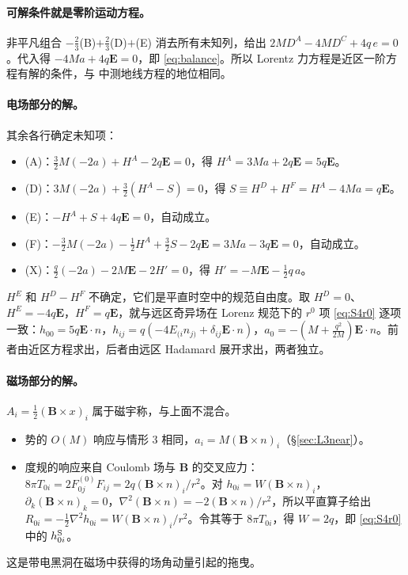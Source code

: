 \documentclass[11pt,a4paper]{ctexart}
\numberwithin{equation}{section}
\begin{document}
\paragraph{可解条件就是零阶运动方程。}非平凡组合 $-\tfrac23$(B)$+\tfrac23$(D)$+$(E) 消去所有未知列，给出 $2MD^A-4MD^C+4q\,e=0$。代入得 $-4Ma+4q\boldsymbol E=0$，即 \eqref{eq:balance}。所以 Lorentz 力方程是近区一阶方程有解的条件，与 \citet{GrallaWald2008} 中测地线方程的地位相同。

\paragraph{电场部分的解。}其余各行确定未知项：
\begin{itemize}
\item (A)：$\tfrac32M(-2a)+H^A-2q\boldsymbol E=0$，得 $H^A=3Ma+2q\boldsymbol E=5q\boldsymbol E$。
\item (D)：$3M(-2a)+\tfrac32(H^A-S)=0$，得 $S\equiv H^D+H^F=H^A-4Ma=q\boldsymbol E$。
\item (E)：$-H^A+S+4q\boldsymbol E=0$，自动成立。
\item (F)：$-\tfrac32M(-2a)-\tfrac12H^A+\tfrac32S-2q\boldsymbol E=3Ma-3q\boldsymbol E=0$，自动成立。
\item (X)：$\tfrac q2(-2a)-2M\boldsymbol E-2H'=0$，得 $H'=-M\boldsymbol E-\tfrac12q\,a$。
\end{itemize}
$H^E$ 和 $H^D-H^F$ 不确定，它们是平直时空中的规范自由度。取 $H^D=0$、$H^E=-4q\boldsymbol E$，$H^F=q\boldsymbol E$，就与远区奇异场在 Lorenz 规范下的 $r^0$ 项 \eqref{eq:S4r0} 逐项一致：$h_{00}=5q\boldsymbol E\cdot n$，$h_{ij}=q(-4E_{(i}n_{j)}+\delta_{ij}\boldsymbol E\cdot n)$，$a_0=-(M+\tfrac{q^2}{2M})\boldsymbol E\cdot n$。前者由近区方程求出，后者由远区 Hadamard 展开求出，两者独立。

\paragraph{磁场部分的解。}$A_i=\tfrac12(\boldsymbol B\times x)_i$ 属于磁宇称，与上面不混合。
\begin{itemize}
\item 势的 $O(M)$ 响应与情形 3 相同，$a_i=M(\boldsymbol B\times n)_i$（\S\ref{sec:L3near}）。
\item 度规的响应来自 Coulomb 场与 $\boldsymbol B$ 的交叉应力：$8\pi T_{0i}=2F^{(0)}_{0j}F_{ij}=2q(\boldsymbol B\times n)_i/r^2$。对 $h_{0i}=W(\boldsymbol B\times n)_i$，$\partial_k(\boldsymbol B\times n)_k=0$，$\nabla^2(\boldsymbol B\times n)=-2(\boldsymbol B\times n)/r^2$，所以平直算子给出 $R_{0i}=-\tfrac12\nabla^2h_{0i}=W(\boldsymbol B\times n)_i/r^2$。令其等于 $8\pi T_{0i}$，得 $W=2q$，即 \eqref{eq:S4r0} 中的 $h^{\rm S}_{0i}$。
\end{itemize}
这是带电黑洞在磁场中获得的场角动量引起的拖曳。
\end{document}
